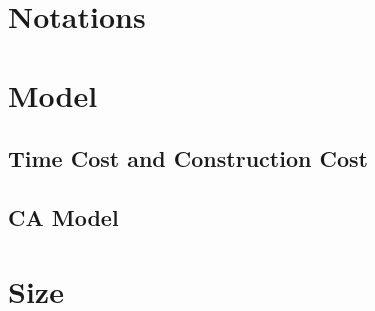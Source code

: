\documentclass{mcmthesis}
\begin{document}
\section{Notations}

\section{Model}
\subsection{Time Cost and Construction Cost}
\subsection{CA Model}

\section{Size}
\end{document}
